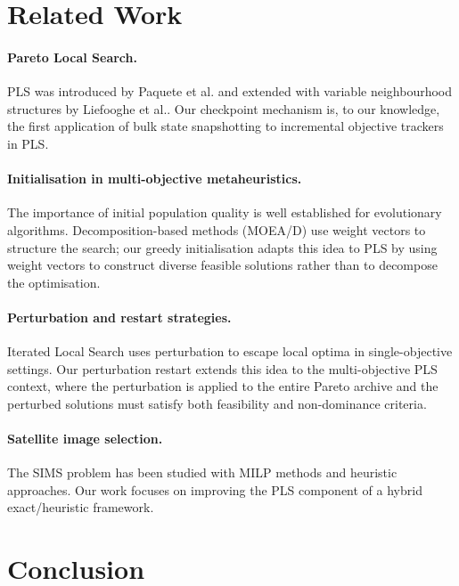 \documentclass[11pt,a4paper]{article}
\begin{document}
\section{Related Work}\label{sec:related}

\paragraph{Pareto Local Search.}
PLS was introduced by Paquete et al. and extended
with variable neighbourhood structures by Liefooghe et
al..  Our checkpoint mechanism is, to our
knowledge, the first application of bulk state snapshotting to
incremental objective trackers in PLS.

\paragraph{Initialisation in multi-objective metaheuristics.}
The importance of initial population quality is well established for
evolutionary algorithms.  Decomposition-based
methods (MOEA/D) use weight vectors to structure
the search; our greedy initialisation adapts this idea to PLS by using
weight vectors to construct diverse feasible solutions rather than to
decompose the optimisation.

\paragraph{Perturbation and restart strategies.}
Iterated Local Search uses perturbation to escape
local optima in single-objective settings.  Our perturbation restart
extends this idea to the multi-objective PLS context, where the
perturbation is applied to the entire Pareto archive and the perturbed
solutions must satisfy both feasibility and non-dominance criteria.

\paragraph{Satellite image selection.}
The SIMS problem has been studied with MILP
methods and heuristic
approaches.  Our work focuses on
improving the PLS component of a hybrid exact/heuristic framework.

\section{Conclusion}\label{sec:conclusion}
\end{document}
